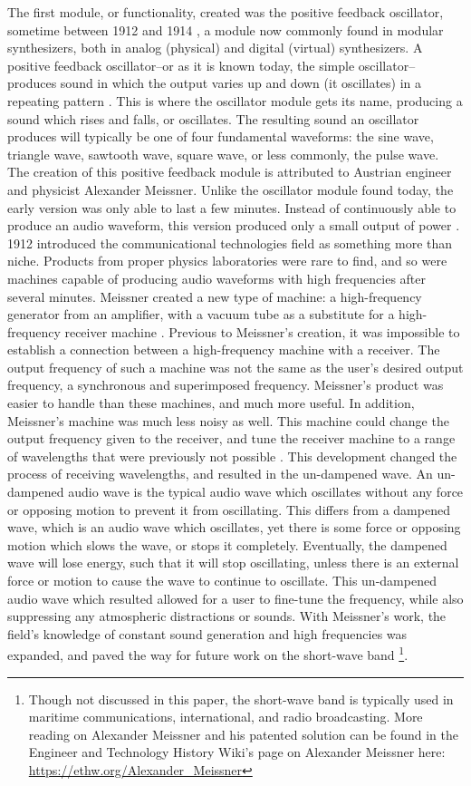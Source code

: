 The first module, or functionality, created was the positive feedback oscillator, sometime between 1912 and 1914 \cite{Gabrielli_2020}, a module now commonly found in modular synthesizers, both in analog (physical) and digital (virtual) synthesizers. A positive feedback oscillator--or as it is known today, the simple oscillator--produces sound in which the output varies up and down (it oscillates) in a repeating pattern \cite{Meyer_2016}.  This is where the oscillator module gets its name, producing a sound which rises and falls, or oscillates. The resulting sound an oscillator produces will typically be one of four fundamental waveforms: the sine wave, triangle wave, sawtooth wave, square wave, or less commonly, the pulse wave. The creation of this positive feedback module is attributed to Austrian engineer and physicist Alexander Meissner. Unlike the oscillator module found today, the early version was only able to last a few minutes. Instead of continuously able to produce an audio waveform, this version produced only a small output of power \cite{Fleming_1919}. 1912 introduced the communicational technologies field as something more than niche. Products from proper physics laboratories were rare to find, and so were machines capable of producing audio waveforms with high frequencies after several minutes. Meissner created a new type of machine: a high-frequency generator from an amplifier, with a vacuum tube as a substitute for a high-frequency receiver machine \cite{Fleming_1919}. Previous to Meissner's creation, it was impossible to establish a connection between a high-frequency machine with a receiver. The output frequency of such a machine was not the same as the user's desired output frequency, a synchronous and superimposed frequency. Meissner's product was easier to handle than these machines, and much more useful. In addition, Meissner's machine was much less noisy as well. This machine could change the output frequency given to the receiver, and tune the receiver machine to a range of wavelengths that were previously not possible \cite{Fleming_1919}. This development changed the process of receiving wavelengths, and resulted in the un-dampened wave. An un-dampened audio wave is the typical audio wave which oscillates without any force or opposing motion to prevent it from oscillating. This differs from a dampened wave, which is an audio wave which oscillates, yet there is some force or opposing motion which slows the wave, or stops it completely. Eventually, the dampened wave will lose energy, such that it will stop oscillating, unless there is an external force or motion to cause the wave to continue to oscillate. This un-dampened audio wave which resulted allowed for a user to fine-tune the frequency, while also suppressing any atmospheric distractions or sounds. With Meissner's work, the field's knowledge of constant sound generation and high frequencies was expanded, and paved the way for future work on the short-wave band \footnote{Though not discussed in this paper, the short-wave band is typically used in maritime communications, international, and radio broadcasting. More reading on Alexander Meissner and his patented solution can be found in the Engineer and Technology History Wiki's page on Alexander Meissner here: \url{https://ethw.org/Alexander_Meissner}}.

